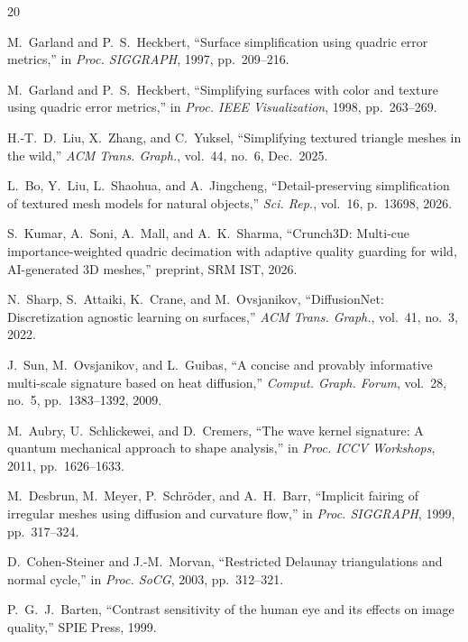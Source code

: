 \documentclass[10pt, twocolumn, a4paper]{article}
\begin{document}
\begin{thebibliography}{20}
\footnotesize

M.~Garland and P.~S.~Heckbert,
``Surface simplification using quadric error metrics,''
in \textit{Proc. SIGGRAPH}, 1997, pp.~209--216.

M.~Garland and P.~S.~Heckbert,
``Simplifying surfaces with color and texture using quadric error
metrics,''
in \textit{Proc. IEEE Visualization}, 1998, pp.~263--269.

H.-T.~D.~Liu, X.~Zhang, and C.~Yuksel,
``Simplifying textured triangle meshes in the wild,''
\textit{ACM Trans. Graph.}, vol.~44, no.~6, Dec.\ 2025.

L.~Bo, Y.~Liu, L.~Shaohua, and A.~Jingcheng,
``Detail-preserving simplification of textured mesh models for
natural objects,''
\textit{Sci. Rep.}, vol.~16, p.~13698, 2026.

S.~Kumar, A.~Soni, A.~Mall, and A.~K.~Sharma,
``Crunch3D: Multi-cue importance-weighted quadric decimation with
adaptive quality guarding for wild, AI-generated 3D meshes,''
preprint, SRM IST, 2026.

N.~Sharp, S.~Attaiki, K.~Crane, and M.~Ovsjanikov,
``DiffusionNet: Discretization agnostic learning on surfaces,''
\textit{ACM Trans. Graph.}, vol.~41, no.~3, 2022.

J.~Sun, M.~Ovsjanikov, and L.~Guibas,
``A concise and provably informative multi-scale signature based on
heat diffusion,''
\textit{Comput. Graph. Forum}, vol.~28, no.~5, pp.~1383--1392, 2009.

M.~Aubry, U.~Schlickewei, and D.~Cremers,
``The wave kernel signature: A quantum mechanical approach to shape
analysis,''
in \textit{Proc. ICCV Workshops}, 2011, pp.~1626--1633.

M.~Desbrun, M.~Meyer, P.~Schr{\"o}der, and A.~H.~Barr,
``Implicit fairing of irregular meshes using diffusion and
curvature flow,''
in \textit{Proc. SIGGRAPH}, 1999, pp.~317--324.

D.~Cohen-Steiner and J.-M.~Morvan,
``Restricted Delaunay triangulations and normal cycle,''
in \textit{Proc. SoCG}, 2003, pp.~312--321.

P.~G.~J.~Barten,
``Contrast sensitivity of the human eye and its effects on image
quality,''
SPIE Press, 1999.


\end{thebibliography}
\end{document}
